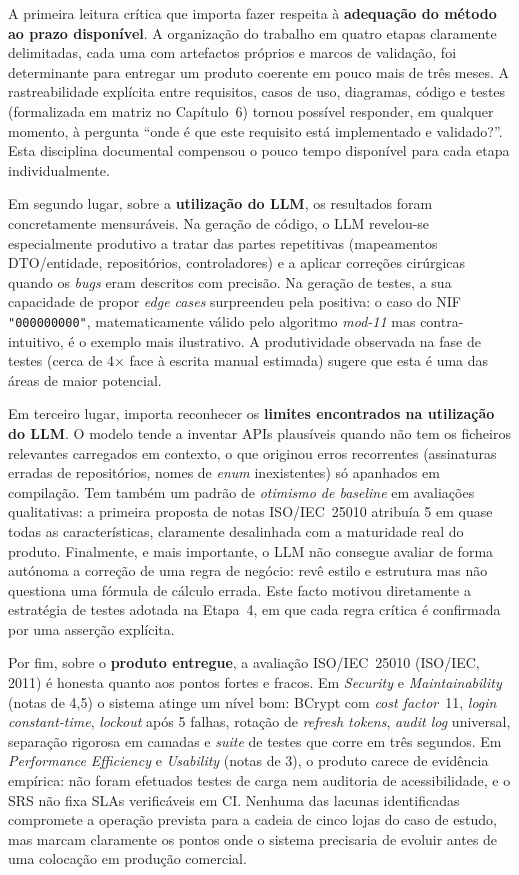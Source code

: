     A primeira leitura crítica que importa fazer respeita à \textbf{adequação do método ao prazo disponível}. A organização do trabalho em quatro etapas claramente delimitadas, cada uma com artefactos próprios e marcos de validação, foi determinante para entregar um produto coerente em pouco mais de três meses. A rastreabilidade explícita entre requisitos, casos de uso, diagramas, código e testes (formalizada em matriz no Capítulo~6) tornou possível responder, em qualquer momento, à pergunta ``onde é que este requisito está implementado e validado?''. Esta disciplina documental compensou o pouco tempo disponível para cada etapa individualmente.

    Em segundo lugar, sobre a \textbf{utilização do LLM}, os resultados foram concretamente mensuráveis. Na geração de código, o LLM revelou-se especialmente produtivo a tratar das partes repetitivas (mapeamentos DTO/entidade, repositórios, controladores) e a aplicar correções cirúrgicas quando os \textit{bugs} eram descritos com precisão. Na geração de testes, a sua capacidade de propor \textit{edge cases} surpreendeu pela positiva: o caso do NIF \texttt{"000000000"}, matematicamente válido pelo algoritmo \textit{mod-11} mas contra-intuitivo, é o exemplo mais ilustrativo. A produtividade observada na fase de testes (cerca de 4$\times$ face à escrita manual estimada) sugere que esta é uma das áreas de maior potencial.

    Em terceiro lugar, importa reconhecer os \textbf{limites encontrados na utilização do LLM}. O modelo tende a inventar APIs plausíveis quando não tem os ficheiros relevantes carregados em contexto, o que originou erros recorrentes (assinaturas erradas de repositórios, nomes de \textit{enum} inexistentes) só apanhados em compilação. Tem também um padrão de \textit{otimismo de baseline} em avaliações qualitativas: a primeira proposta de notas ISO/IEC~25010 atribuía 5 em quase todas as características, claramente desalinhada com a maturidade real do produto. Finalmente, e mais importante, o LLM não consegue avaliar de forma autónoma a correção de uma regra de negócio: revê estilo e estrutura mas não questiona uma fórmula de cálculo errada. Este facto motivou diretamente a estratégia de testes adotada na Etapa~4, em que cada regra crítica é confirmada por uma asserção explícita.

    Por fim, sobre o \textbf{produto entregue}, a avaliação ISO/IEC~25010 (ISO/IEC, 2011) é honesta quanto aos pontos fortes e fracos. Em \textit{Security} e \textit{Maintainability} (notas de 4,5) o sistema atinge um nível bom: BCrypt com \textit{cost factor}~11, \textit{login} \textit{constant-time}, \textit{lockout} após 5 falhas, rotação de \textit{refresh tokens}, \textit{audit log} universal, separação rigorosa em camadas e \textit{suite} de testes que corre em três segundos. Em \textit{Performance Efficiency} e \textit{Usability} (notas de 3), o produto carece de evidência empírica: não foram efetuados testes de carga nem auditoria de acessibilidade, e o SRS não fixa SLAs verificáveis em CI. Nenhuma das lacunas identificadas compromete a operação prevista para a cadeia de cinco lojas do caso de estudo, mas marcam claramente os pontos onde o sistema precisaria de evoluir antes de uma colocação em produção comercial.

